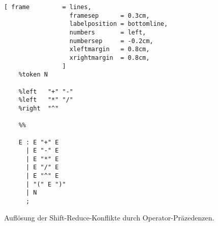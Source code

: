 \begin{figure}[!ht]
\centering
\begin{Verbatim}[ frame         = lines, 
                  framesep      = 0.3cm, 
                  labelposition = bottomline,
                  numbers       = left,
                  numbersep     = -0.2cm,
                  xleftmargin   = 0.8cm,
                  xrightmargin  = 0.8cm,
                ]
    %token N
    
    %left   "+" "-"
    %left   "*" "/"
    %right  "^"
    
    %%
    
    E : E "+" E
      | E "-" E
      | E "*" E
      | E "/" E
      | E "^" E
      | "(" E ")"
      | N
      ;
\end{Verbatim}
\vspace*{-0.3cm}
\caption{Aufl\"osung der Shift-Reduce-Konflikte durch Operator-Pr\"azedenzen.}
\label{fig:calc-precedence.y}
\end{figure}

